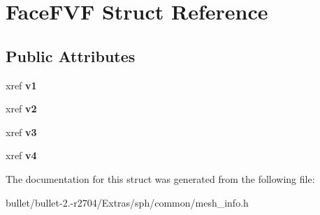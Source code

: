 \hypertarget{struct_face_f_v_f}{\section{Face\+F\+V\+F Struct Reference}
\label{struct_face_f_v_f}
}
\subsection*{Public Attributes}
\begin{DoxyCompactItemize}
\item 
\hypertarget{struct_face_f_v_f_a11f95379cda58c62ed18440b1523c41b}{xref {\bfseries v1}}\label{struct_face_f_v_f_a11f95379cda58c62ed18440b1523c41b}

\item 
\hypertarget{struct_face_f_v_f_ad9c91ca728916d3195bdd79220e7793f}{xref {\bfseries v2}}\label{struct_face_f_v_f_ad9c91ca728916d3195bdd79220e7793f}

\item 
\hypertarget{struct_face_f_v_f_a7e4cc6e11877b8499c9e0db8ff267640}{xref {\bfseries v3}}\label{struct_face_f_v_f_a7e4cc6e11877b8499c9e0db8ff267640}

\item 
\hypertarget{struct_face_f_v_f_ac4c07f5b3ca531784291916d9a634a81}{xref {\bfseries v4}}\label{struct_face_f_v_f_ac4c07f5b3ca531784291916d9a634a81}

\end{DoxyCompactItemize}


The documentation for this struct was generated from the following file\+:\begin{DoxyCompactItemize}
\item 
bullet/bullet-\/2.-\/r2704/\+Extras/sph/common/mesh\+\_\+info.\+h\end{DoxyCompactItemize}
